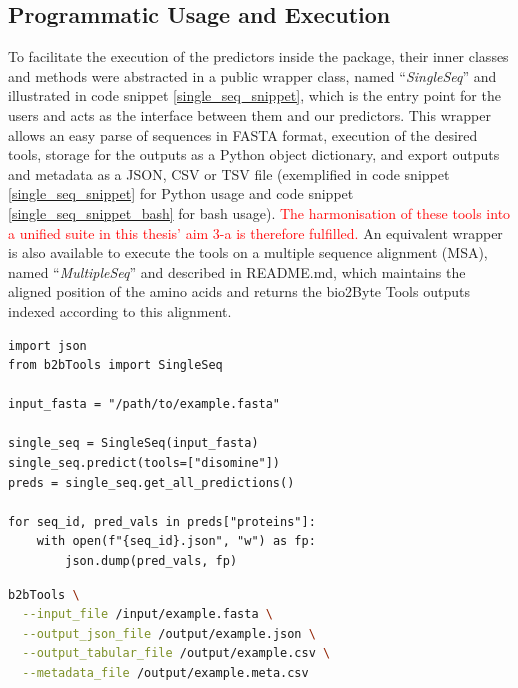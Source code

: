 \subsection{Programmatic Usage and Execution}

To facilitate the execution of the predictors inside the package, their inner classes and methods were abstracted in a public wrapper class, named ``\textit{SingleSeq}'' and illustrated in code snippet \ref{single_seq_snippet}, which is the entry point for the users and acts as the interface between them and our predictors. This wrapper allows an easy parse of sequences in FASTA format, execution of the desired tools, storage for the outputs as a Python object dictionary, and export outputs and metadata as a JSON, CSV or TSV file (exemplified in code snippet \ref{single_seq_snippet} for Python usage and code snippet \ref{single_seq_snippet_bash} for bash usage). \textcolor{red}{The harmonisation of these tools into a unified suite in this thesis' aim 3-a is therefore fulfilled.} An equivalent wrapper is also available to execute the tools on a multiple sequence alignment (MSA), named ``\textit{MultipleSeq}'' and described in README.md, which maintains the aligned position of the amino acids and returns the bio2Byte Tools outputs indexed according to this alignment.


\begin{lstlisting}[caption={\textbf{Python execution of bio2Byte Tools.} This code will store for each individual sequence contained in \textit{example.fasta} a \textit{.json} output file with the predictions of the selected tools and their dependencies.}, label={single_seq_snippet}, float] 
import json
from b2bTools import SingleSeq

input_fasta = "/path/to/example.fasta"

single_seq = SingleSeq(input_fasta)
single_seq.predict(tools=["disomine"])
preds = single_seq.get_all_predictions()

for seq_id, pred_vals in preds["proteins"]:
    with open(f"{seq_id}.json", "w") as fp:
        json.dump(pred_vals, fp)
\end{lstlisting}

\begin{lstlisting}[language=bash, caption={\textbf{Bash execution of bio2Byte Tools.} This code will store the output of all sequences in the \textit{.fasta} input in \textit{.json} and \textit{.csv} files and will also store the metadata in a different file.}, label={single_seq_snippet_bash}, float] 
b2bTools \
  --input_file /input/example.fasta \
  --output_json_file /output/example.json \
  --output_tabular_file /output/example.csv \
  --metadata_file /output/example.meta.csv
\end{lstlisting}

